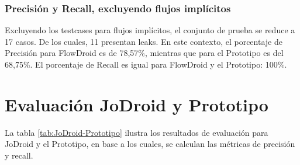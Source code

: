 \subsubsection{Precisión y Recall, excluyendo flujos implícitos}
Excluyendo los testcases para flujos implícitos, el conjunto de prueba se reduce
a 17 casos. De los cuales, 11 presentan leaks.\newline 
En este contexto, el porcentaje de Precisión para FlowDroid es de 78,57\%,
mientras que para el Prototipo es del 68,75\%. El porcentaje de Recall es igual
para FlowDroid y el Prototipo: 100\%.


\section{Evaluación JoDroid y Prototipo}
\label{sec:jod-prot}
La tabla \ref{tab:JoDroid-Prototipo} ilustra los resultados de evaluación para JoDroid y el
Prototipo, en base a los cuales, se calculan las métricas de precisión y recall. 
\label{subsec:jvsp}
